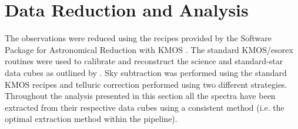 \documentclass[iop]{emulateapj}
\begin{document}




\section{Data Reduction and Analysis} %
\label{sec:data_reduction_and_analysis}

The observations were reduced using the recipes provided by the Software Package for Astronomical Reduction with KMOS
\citep[SPARK;][]{2013A&A...558A..56D}.
The standard KMOS/esorex routines were used to calibrate and reconstruct the science and standard-star data cubes as outlined by
\cite{2013A&A...558A..56D}.
Sky subtraction was performed using the standard KMOS recipes and telluric correction performed using two different strategies.
Throughout the analysis presented in this section all the spectra have been extracted from their respective data cubes using a consistent method (i.e. the optimal extraction method within the pipeline).
\end{document}

